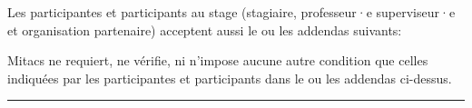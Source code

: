 {\noindent
Les participantes et participants au stage (stagiaire, professeur·e superviseur·e et organisation partenaire) acceptent aussi le ou les addendas suivants:

\noindent
Mitacs ne requiert, ne vérifie, ni n'impose aucune autre condition que celles indiquées par les participantes et participants dans le ou les addendas ci-dessus.
}


\rule{\linewidth}{2pt}

